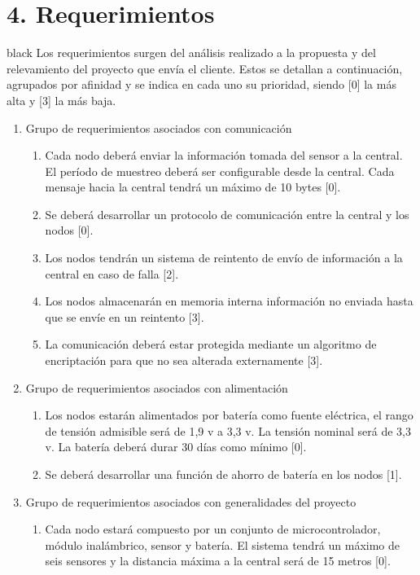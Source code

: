 \documentclass[11pt]{charter}
\begin{document}
\section{4. Requerimientos}
\label{sec:requerimientos}

\begin{consigna}{black}
Los requerimientos surgen del análisis realizado a la propuesta y del relevamiento del proyecto que envía el cliente. Estos se detallan a continuación, agrupados por afinidad y se indica en cada uno su prioridad, siendo [0] la más alta y [3] la más baja.

\begin{enumerate}
\item Grupo de requerimientos asociados con comunicación
	\begin{enumerate}
	\item Cada nodo deberá enviar la información tomada del sensor a la central. El período de muestreo deberá ser configurable desde la central. Cada mensaje hacia la central tendrá un máximo de 10 bytes [0].
	\item Se deberá desarrollar un protocolo de comunicación entre la central y los nodos [0].
	\item Los nodos tendrán un sistema de reintento de envío de información a la central en caso de falla [2].
	\item Los nodos almacenarán en memoria interna información no enviada hasta que se envíe en un reintento [3].
	\item La comunicación deberá estar protegida mediante un algoritmo de encriptación para que no sea alterada externamente [3].
	\end{enumerate}
\item Grupo de requerimientos asociados con alimentación
	\begin{enumerate}
	\item Los nodos estarán alimentados por batería como fuente eléctrica, el rango de tensión admisible será de 1,9 v a 3,3 v. La tensión nominal será de 3,3 v. La batería deberá durar 30 días como mínimo [0].
	\item Se deberá desarrollar una función de ahorro de batería en los nodos [1].
	\end{enumerate}
\item Grupo de requerimientos asociados con generalidades del proyecto
	\begin{enumerate}
	\item Cada nodo estará compuesto por un conjunto de microcontrolador, módulo inalámbrico, sensor y batería. El sistema tendrá un máximo de seis sensores y la distancia máxima a la central será de 15 metros [0].

\end{enumerate}
\end{enumerate}
\end{consigna}
\end{document}
